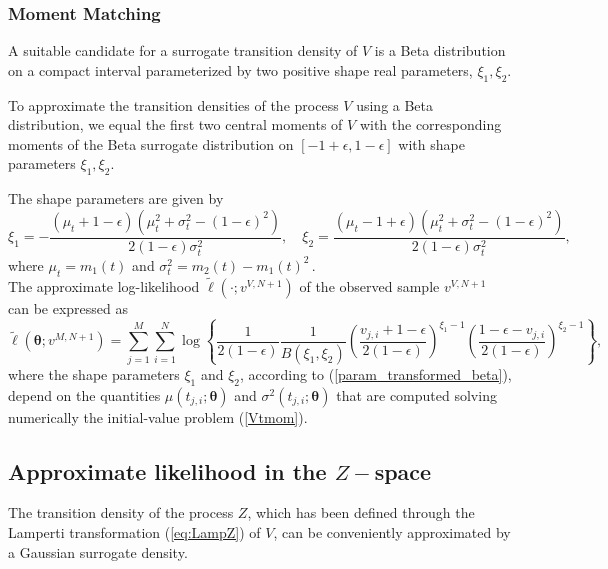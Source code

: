 \documentclass[11pt]{article}
\theoremstyle{definition}
\begin{document}
\subsubsection{Moment Matching}

A suitable candidate for a surrogate transition density of $V$ is a Beta distribution on a compact interval parameterized by two positive shape real parameters, $\xi_1, \xi_2$. 

To approximate the transition densities of the process $V$ using a Beta distribution, we equal the first two central moments of $V$ with the corresponding moments of the Beta surrogate distribution on $[-1 + \epsilon,1 - \epsilon]$ with shape parameters $\xi_1, \xi_2$.

The shape parameters are given by
\begin{equation}
\xi_1 = - \frac{(\mu_t + 1 - \epsilon)(\mu_t^2 + \sigma_t^2 - (1- \epsilon)^2)}{2 (1 - \epsilon) \sigma_t^2}, \quad \xi_2=  \frac{(\mu_t-1 + \epsilon )(\mu_t^2 + \sigma_t^2 - (1- \epsilon)^2)}{2 (1 - \epsilon) \sigma_t^2} , \label{param_transformed_beta}
\end{equation}
where $\mu_t = m_1 (t)$ and $\sigma_t^2= m_2 (t)- m_1 (t)^2\,.$ \\

The approximate log-likelihood $\tilde{\ell}(\cdot ; v^{V, N+1})$ of the observed sample $v^{V, N+1}$ can be expressed as 
\begin{equation}
 \tilde{\ell} \left(\bm{\theta}; v^{M,N +1}\right) = \sum_{j=1}^M \sum_{i=1}^N \log  \left\{ \frac{1}{2(1 - \epsilon)} \frac{1}{B(\xi_1, \xi_2)} \left( \frac{v_{j,i} + 1 - \epsilon}{2(1 - \epsilon)} \right)^{\xi_1 -1}  \left( \frac{1 - \epsilon - v_{j,i}}{2(1 - \epsilon)} \right)^{\xi_2 -1} \right\},
\label{eq:loglikelihoodV}
\end{equation}
where the shape parameters $\xi_1$ and $\xi_2$, according to (\ref{param_transformed_beta}), depend on the quantities $\mu(t_{j,i};\bm{\theta} )$ and $\sigma^2(t_{j,i};\bm{\theta} )$ that are computed solving numerically the initial-value problem (\ref{Vtmom}). 

\subsection{Approximate likelihood  in the $Z-$space}

The transition density of the process $Z$, which has been defined through the Lamperti transformation (\ref{eq:LampZ}) of $V$, can be conveniently approximated by a Gaussian surrogate density. 
\end{document}
